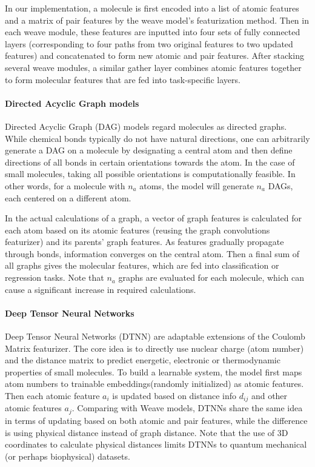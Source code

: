 In our implementation, a molecule is first encoded into a list of atomic features and a matrix of pair features by the weave model's featurization method. Then in each weave module, these features are inputted into four sets of fully connected layers (corresponding to four paths from two original features to two updated features) and concatenated to form new atomic and pair features. After stacking several weave modules, a similar gather layer combines atomic features together to form molecular features that are fed into task-specific layers.

\paragraph{Directed Acyclic Graph models}

Directed Acyclic Graph (DAG) models regard molecules as directed graphs. While chemical bonds typically do not have natural directions, one can arbitrarily generate a DAG on a molecule by designating a central atom and then define directions of all bonds in certain orientations towards the atom.\cite{lusci2013deep} In the case of small molecules, taking all possible orientations is computationally feasible. In other words, for a molecule with $n_a$ atoms, the model will generate $n_a$ DAGs, each centered on a different atom. 

In the actual calculations of a graph, a vector of graph features is calculated for each atom based on its atomic features (reusing the graph convolutions featurizer) and its parents' graph features. As features gradually propagate through bonds, information converges on the central atom. Then a final sum of all graphs gives the molecular features, which are fed into classification or regression tasks. Note that $n_a$ graphs are evaluated for each molecule, which can cause a significant increase in required calculations.

\paragraph{Deep Tensor Neural Networks}

Deep Tensor Neural Networks (DTNN) are adaptable extensions of the Coulomb Matrix featurizer.\cite{schutt2016quantum} The core idea is to directly use nuclear charge (atom number) and the distance matrix to predict energetic, electronic or thermodynamic properties of small molecules. To build a learnable system, the model first maps atom numbers to trainable embeddings(randomly initialized) as atomic features. Then each atomic feature $a_i$ is updated based on distance info $d_{ij}$ and other atomic features $a_j$. Comparing with Weave models, DTNNs share the same idea in terms of updating based on both atomic and pair features, while the difference is using physical distance instead of graph distance. Note that the use of 3D coordinates to calculate physical distances limits DTNNs to quantum mechanical (or perhaps biophysical) datasets.


